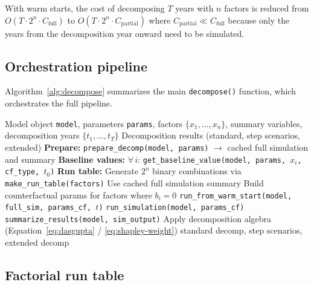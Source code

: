 \documentclass[11pt]{article}
\newcommand{\code}[1]{\texttt{#1}}
\begin{document}
With warm starts, the cost of decomposing $T$ years with $n$ factors is
reduced from $O(T \cdot 2^n \cdot C_{\text{full}})$ to
$O(T \cdot 2^n \cdot C_{\text{partial}})$ where
$C_{\text{partial}} \ll C_{\text{full}}$ because only the years from
the decomposition year onward need to be simulated.

\subsection{Orchestration pipeline}

Algorithm~\ref{alg:decompose} summarizes the main \code{decompose()}
function, which orchestrates the full pipeline.

\begin{algorithm}[ht]
\caption{The \code{decompose()} orchestration pipeline.}
\label{alg:decompose}
\begin{algorithmic}[1]
\Require Model object \code{model}, parameters \code{params}, factors
  $\{x_1, \ldots, x_n\}$, summary variables, decomposition years
  $\{t_1, \ldots, t_T\}$
\Ensure Decomposition results (standard, step scenarios, extended)
\State \textbf{Prepare:}
  \code{prepare\_decomp(model, params)} $\to$
  cached full simulation and summary
\State \textbf{Baseline values:}
  $\forall\, i$: \code{get\_baseline\_value(model, params, $x_i$,
  cf\_type, $t_0$)}
\State \textbf{Run table:}
  Generate $2^n$ binary combinations via
  \code{make\_run\_table(factors)}
      \State Use cached full simulation summary
    \Else
      \State Build counterfactual params for factors where $b_i = 0$
        \State \code{run\_from\_warm\_start(model, full\_sim,
          params\_cf, $t$)}
      \Else
        \State \code{run\_simulation(model, params\_cf)}
      \EndIf
      \State \code{summarize\_results(model, sim\_output)}
    \EndIf
  \EndFor
  \State Apply decomposition algebra
    (Equation~\ref{eq:dasgupta} / \ref{eq:shapley-weight})
\EndFor
\State \Return standard decomp, step scenarios, extended decomp
\end{algorithmic}
\end{algorithm}


\subsection{Factorial run table}
\end{document}
